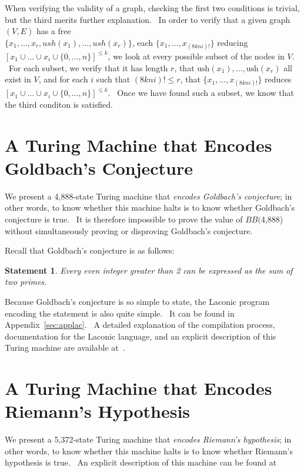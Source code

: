 \documentclass[11pt]{article}
\newtheorem{statement}{Statement}
\newcommand{\gbstatenumstate}{4,888-state }
\newcommand{\bbgbstatenum}{$BB($4,888) }
\newcommand{\rmstatenumstate}{5,372-state }
\begin{document}
When verifying the validity of a graph, checking the first two conditions is trivial, but the third merits further explanation. \ In order to verify that a given graph $(V, E)$ has a free \\ $\{x_1,\dots,x_r, ush(x_1),...,ush(x_r)\}$, each  $\{x_1, \dots, x_{(8kni)!}\}$ reducing $[x_1 \cup \dots \cup x_i \cup \{0,\dots,n\}]^{\le k}$, we look at every possible subset of the nodes in $V$. \ For each subset, we verify that it has length $r$, that $\textrm{ush}(x_1),...,\textrm{ush}(x_r)$ all exist in $V$, and for each $i$ such that $(8kni)! \le r$, that $\{x_1, \dots, x_{(8kni)!}\}$ reduces $[x_1 \cup \dots \cup x_i \cup \{0,\dots,n\}]^{\le k}$. \ Once we have found such a subset, we know that the third conditon is satisfied.

\section{A Turing Machine that Encodes Goldbach's Conjecture} \label{sec:g}

We present a \gbstatenumstate Turing machine that \emph{encodes Goldbach's conjecture}; in other words, to know whether this machine halts is to know whether Goldbach's conjecture is true. \ It is therefore impossible to prove the value of \bbgbstatenum without simultaneously proving or disproving Goldbach's conjecture.

Recall that Goldbach's conjecture is as follows:

\begin{statement}
\emph{Every even integer greater than 2 can be expressed as the sum of two primes.}
\label{goldbachstatement}
\end{statement}

Because Goldbach's conjecture is so simple to state, the Laconic program encoding the statement is also quite simple. \ It can be found in Appendix~\ref{sec:applac}. \ A detailed explanation of the compilation process, documentation for the Laconic language, and an explicit description of this Turing machine are available at~\cite{github}.

\section{A Turing Machine that Encodes Riemann's Hypothesis}

We present a \rmstatenumstate Turing machine that \emph{encodes Riemann's hypothesis}; in other words, to know whether this machine halts is to know whether Riemann's hypothesis is true. \ An explicit description of this machine can be found at~\cite{github}
\end{document}
